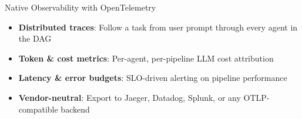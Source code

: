 \begin{frame}{Native Observability with OpenTelemetry}
\begin{center}
  \end{center}
  \vspace{-0.2cm}
  \scriptsize
  \begin{itemize}
    \item \textbf{Distributed traces}: Follow a task from user prompt through every agent in the DAG
    \item \textbf{Token \& cost metrics}: Per-agent, per-pipeline LLM cost attribution
    \item \textbf{Latency \& error budgets}: SLO-driven alerting on pipeline performance
    \item \textbf{Vendor-neutral}: Export to Jaeger, Datadog, Splunk, or any OTLP-compatible backend
  \end{itemize}
\end{frame}

